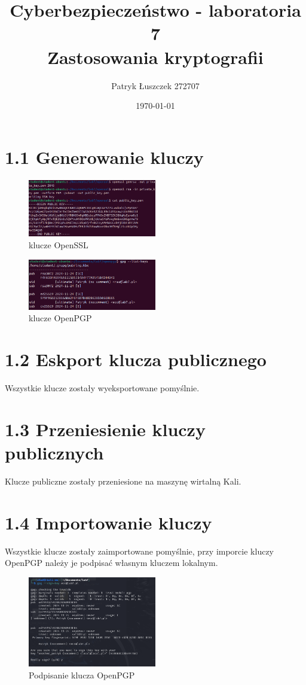 \documentclass{article}
\title{%
  Cyberbezpieczeństwo - laboratoria 7 \\
  \large Zastosowania kryptografii}
\author{Patryk Łuszczek 272707}
\date{\today}
\begin{document}
\maketitle
\newpage

\section*{1.1 Generowanie kluczy}

\begin{figure}[H]
    \centering
    \includegraphics[width=0.5\textwidth]{openssl_pub_key.png}
    \caption{klucze OpenSSL}
\end{figure}

\begin{figure}[H]
    \centering
    \includegraphics[width=0.5\textwidth]{openpgp_list_keys.png}
    \caption{klucze OpenPGP}
\end{figure}

\section*{1.2 Eskport klucza publicznego}
Wszystkie klucze zostały wyeksportowane pomyślnie.
\section*{1.3 Przeniesienie kluczy publicznych}
Klucze publiczne zostały przeniesione na maszynę wirtalną Kali.
\section*{1.4 Importowanie kluczy}
Wszystkie klucze zostały zaimportowane pomyślnie, przy imporcie kluczy OpenPGP należy je podpisać własnym kluczem lokalnym.

\begin{figure}[H]
    \centering
    \includegraphics[width=0.5\textwidth]{sign_imported_key.png}
    \caption{Podpisanie klucza OpenPGP}
\end{figure}
\end{document}
